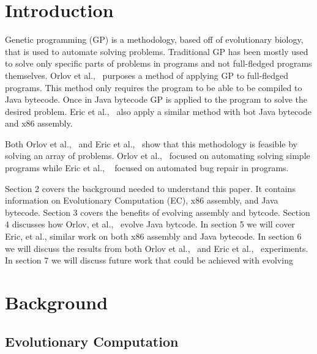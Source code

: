\documentclass{sig-alternate}
\begin{document}

\section{Introduction}
Genetic programming (GP) is a methodology, based off of evolutionary biology, that is used to automate solving problems. Traditional GP has been mostly used to solve only specific parts of problems in programs and not full-fledged programs themselves. Orlov et al.,~\cite{FINCH2:2009} purposes a method of applying GP to full-fledged programs. This method only requires the program to be able to be compiled to Java bytecode. Once in Java bytecode GP is applied to the program to solve the desired problem. Eric et al.,~\cite{Assembly:2010} also apply a similar method with bot Java bytecode and x86 assembly.\par
	Both Orlov et al.,~\cite{FINCH:2011} and Eric et al.,~\cite{Assembly:2010} show that this methodology is feasible by solving an array of problems. Orlov et al.,~\cite{FINCH2:2011} focused on automating solving simple programs while Eric et al., ~\cite{Assembly:2010} focused on automated bug repair in programs. 
	
Section 2 covers the background needed to understand this paper. It contains information on Evolutionary Computation (EC), x86 assembly, and Java bytecode. Section 3 covers the benefits of evolving assembly and bytcode. Section 4 discusses how Orlov, et al.,~\cite{FINCH:2011} evolve Java bytcode. In section 5 we will cover Eric, et al., similar work on both x86 assembly and Java bytecode. In section 6 we will discuss the results from both Orlov et al.,~\cite{FINCH:2011} and Eric et al.,~\cite{Assembly:2010} experiments. In section 7 we will discuss future work that could be achieved with evolving 
	
	

\section{Background}

\subsection{Evolutionary Computation}
\end{document}
